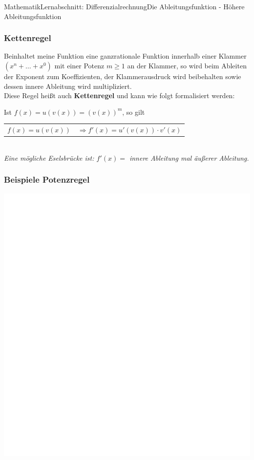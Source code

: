 \documentclass[11pt,twocolumn,oneside,openany,headings=optiontotoc,11pt,numbers=noenddot]{article}
\begin{document}
\begin{worksheet}{Mathematik}{Lernabschnitt: Differenzialrechnung}{Die Ableitungsfunktion - Höhere Ableitungsfunktion}
		\subsubsection{Kettenregel}
		Beinhaltet meine Funktion eine ganzrationale Funktion innerhalb einer Klammer \((x^n + \ldots + x^0)\) mit einer Potenz \(m \ge 1\) an der Klammer, so wird beim Ableiten der Exponent zum Koeffizienten, der Klammerausdruck wird beibehalten sowie dessen innere Ableitung wird multipliziert.\\
		Diese Regel heißt auch \textbf{Kettenregel} und kann wie folgt formalisiert werden:
		\begin{framed}
			\noindent
			Ist \(f(x) = u(v(x)) = (v(x))^m\), so gilt
			\begin{tabularx}{0.7\textwidth}{lX}
				\(f(x) = u(v(x))\) & \(\Rightarrow f'(x) = u'(v(x))\cdot{}v'(x)\)
			\end{tabularx}\\
			\textit{Eine mögliche Eselsbrücke ist: \(f'(x) = \) innere Ableitung mal äußerer Ableitung.}
		\end{framed}
		\subsubsection*{Beispiele Potenzregel}
		\includegraphics[scale=0.2]{../../empty.jpg}\\	
	\end{worksheet}
\end{document}
